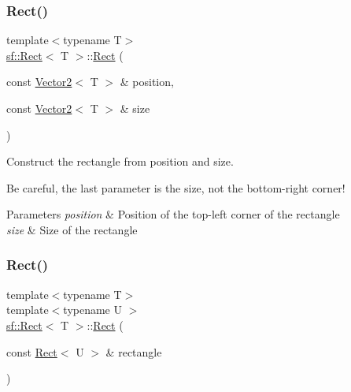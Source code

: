 \subsubsection{\texorpdfstring{Rect()}{Rect()}\hspace{0.1cm}{\footnotesize\ttfamily [3/4]}}
{\footnotesize\ttfamily template$<$typename T$>$ \\
\hyperlink{classsf_1_1_rect}{sf\+::\+Rect}$<$ T $>$\+::\hyperlink{classsf_1_1_rect}{Rect} (\begin{DoxyParamCaption}\item[{const \hyperlink{classsf_1_1_vector2}{Vector2}$<$ T $>$ \&}]{position,  }\item[{const \hyperlink{classsf_1_1_vector2}{Vector2}$<$ T $>$ \&}]{size }\end{DoxyParamCaption})}



Construct the rectangle from position and size. 

Be careful, the last parameter is the size, not the bottom-\/right corner!


\begin{DoxyParams}{Parameters}
{\em position} & Position of the top-\/left corner of the rectangle \\
\hline
{\em size} & Size of the rectangle \\
\hline
\end{DoxyParams}
\mbox{\label{classsf_1_1_rect_a6fff2bb7e93677839461a66bc2957de0}} 
\subsubsection{\texorpdfstring{Rect()}{Rect()}\hspace{0.1cm}{\footnotesize\ttfamily [4/4]}}
{\footnotesize\ttfamily template$<$typename T$>$ \\
template$<$typename U $>$ \\
\hyperlink{classsf_1_1_rect}{sf\+::\+Rect}$<$ T $>$\+::\hyperlink{classsf_1_1_rect}{Rect} (\begin{DoxyParamCaption}\item[{const \hyperlink{classsf_1_1_rect}{Rect}$<$ U $>$ \&}]{rectangle }\end{DoxyParamCaption})\hspace{0.3cm}{\ttfamily [explicit]}}



